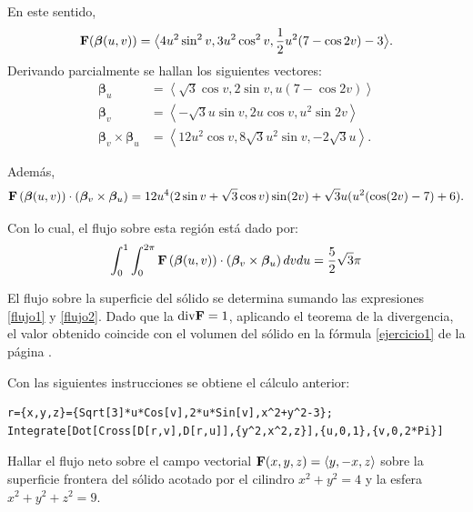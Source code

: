 \begin{parrafonumerado}
En este sentido,
\[{\bf F}({\bm \beta}(u,v))=\big \langle 4u^2\sin^2v,3u^2\cos^2v, \linebreak
\frac{1}{2}u^{2}(7-\cos 2v)-3\big \rangle .\]
Derivando parcialmente se hallan los siguientes vectores:
\begin{align*}
{\bm \beta}_{u}&=\left\langle \sqrt{3}\cos v,2\sin v,u\left( 7-\cos 2v\right)\right\rangle \\
{\bm \beta}_{v}&=\left\langle -\sqrt{3}u\sin v,2u\cos v,u^{2}\sin 2v\right\rangle \\
{\bm \beta}_{v}\times {\bm \beta}_{u}&=\left\langle 12u^{2}\cos v,8\sqrt{3}u^{2}\sin v,-2\sqrt{3}u\right\rangle.
\end{align*}

Además,
\begin{gather*}
{\bf F}\left({\bm \beta}(u,v)\right) \cdot \left({\bm \beta}_{v}\times {\bm \beta}_{u}\right) = 12u^{4}(2\sin v+\sqrt{3}\cos v)\sin(2v)+\sqrt{3}u(u^{2}(\cos(2v)-7) +6).
\end{gather*}

Con lo cual, el flujo sobre esta región está dado por:
\begin{equation}\label{flujo2}
\int_{0}^{1}\int_{0}^{2\pi}{\bf F}\left({\bm \beta}(u,v)\right) \cdot \left({\bm \beta}_{v}\times {\bm \beta}_{u}\right)dvdu=\frac{5}{2}\sqrt{3}\pi
\end{equation}

El flujo sobre la superficie del sólido se determina sumando las expresiones \ref{flujo1} y \ref{flujo2}.
Dado que la ${\rm div}{\bf F}=1$, aplicando el teorema de la divergencia, el valor obtenido coincide con el volumen del sólido en la fórmula \ref{ejercicio1} de la página \pageref{ejercicio1}.

Con las siguientes instrucciones se obtiene el cálculo anterior:

\begin{tcolorbox}[title=\bf Instrucción \verb"Mathematica"]\begin{Verbatim}[formatcom=\letraverbatim]
r={x,y,z}={Sqrt[3]*u*Cos[v],2*u*Sin[v],x^2+y^2-3};
Integrate[Dot[Cross[D[r,v],D[r,u]],{y^2,x^2,z}],{u,0,1},{v,0,2*Pi}]
\end{Verbatim}
\end{tcolorbox}

\item Hallar el flujo neto sobre el campo vectorial
${\bf F}(x,y,z) = \langle y,-x,z \rangle $ sobre la superficie frontera del sólido acotado por el cilindro $x^2+y^2=4$ y la esfera $x^2+y^2+z^2=9$.


\end{parrafonumerado}
